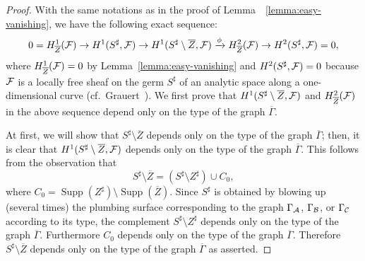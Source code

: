\documentclass[a4paper, reqno, twoside]{amsart}
\theoremstyle{definition}
\numberwithin{equation}{section}
\begin{document}
\begin{proof}
With the same notations as in the proof of
Lemma~~\ref{lemma:easy-vanishing}, we have the following exact sequence:
    \begin{equation}\label{equation:the-exact-sequence}
    0=H^1_{\overline{Z}}({\ensuremath \mathcal{F}}) \to
    H^1(S^{\sharp}, {\ensuremath \mathcal{F}}) \to
    H^1(S^{\sharp} \setminus \overline{Z}, {\ensuremath \mathcal{F}}) \xrightarrow{\phi}
    H^2_{\overline{Z}}({\ensuremath \mathcal{F}}) \to
    H^2(S^{\sharp}, {\ensuremath \mathcal{F}})=0,
    \end{equation}
where $H^1_{\overline{Z}}({\ensuremath \mathcal{F}})=0$ by
Lemma~\ref{lemma:easy-vanishing} and $H^2(S^{\sharp}, {\ensuremath \mathcal{F}})=0$
because ${\ensuremath \mathcal{F}}$ is a locally free sheaf on the germ $S^{\sharp}$
of an analytic space along a one-dimensional curve
(cf.\ Grauert~\cite[Satz 1, p.~355]{Grauert-1962}). We first prove
that $H^1(S^{\sharp} \setminus \overline{Z}, {\ensuremath \mathcal{F}})$ and
$H^2_{\overline{Z}}({\ensuremath \mathcal{F}})$ in the above sequence depend only on
the type of the graph $\overline{\Gamma}$.

At first, we will show that $S^{\sharp} \setminus \overline{Z}$ depends only on the type of the graph $\overline{\Gamma}$; then, it is clear that $H^1(S^{\sharp} \setminus \overline{Z}, {\ensuremath \mathcal{F}})$ depends only on the type of the graph $\overline{\Gamma}$. This follows from the observation that
    \[S^{\sharp} \setminus \overline{Z} = (S^{\sharp} \setminus Z^{\sharp}) \cup C_0,\]
where $C_0 = \operatorname{Supp}(Z^{\sharp}) \setminus \operatorname{Supp}(\overline{Z})$. Since
$S^{\sharp}$ is obtained by blowing up (several times) the plumbing
surface corresponding to the graph $\Gamma_{\ensuremath \mathcal{A}}$,
$\Gamma_{\ensuremath \mathcal{B}}$, or $\Gamma_{\ensuremath \mathcal{C}}$ according to its type, the complement
$S^{\sharp} \setminus Z^{\sharp}$ depends only on the type of the graph
$\overline{\Gamma}$. Furthermore $C_0$ depends only on the type of the graph
$\overline{\Gamma}$. Therefore $S^{\sharp} \setminus \overline{Z}$ depends only on the type of the graph $\overline{\Gamma}$ as asserted.


\end{proof}
\end{document}
